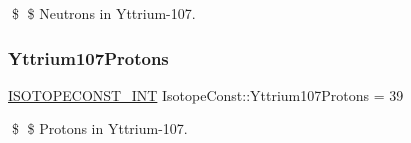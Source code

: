 \$ \$ Neutrons in Yttrium-\/107. \mbox{\label{group___isotope_const-_yttrium-_y107_gafebbca1a04736d147dda77f2d01f4eda}} 
\subsubsection{\texorpdfstring{Yttrium107\+Protons}{Yttrium107Protons}}
{\footnotesize\ttfamily \mbox{\hyperlink{group___isotope_const-_macros_ga5f18360b3e99483a35c32d789e62621c}{I\+S\+O\+T\+O\+P\+E\+C\+O\+N\+S\+T\+\_\+\+I\+NT}} Isotope\+Const\+::\+Yttrium107\+Protons = 39}

\$ \$ Protons in Yttrium-\/107. 